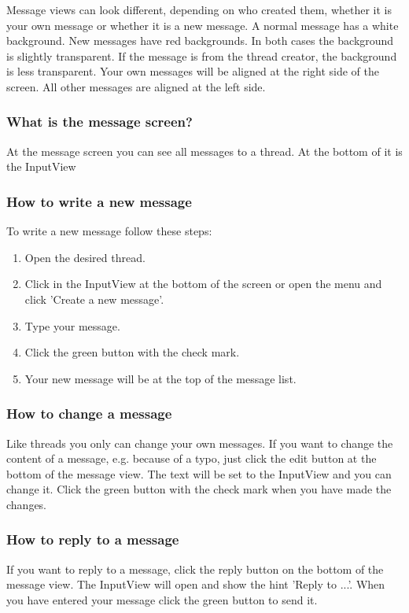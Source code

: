 \documentclass[12pt,a4paper,oneside]{report}
\begin{document}
Message views can look different, depending on who created them, whether it is your own message or whether it is a new message.
A normal message has a white background. New messages have red backgrounds. In both cases the background is slightly transparent. If the message is from the thread creator, the background is less transparent. 
Your own messages will be aligned at the right side of the screen. All other messages are aligned at the left side.

\subsubsection{What is the message screen?}
At the message screen you can see all messages to a thread. At the bottom of it is the InputView

\subsubsection{How to write a new message}
To write a new message follow these steps:
\begin{enumerate}
\item Open the desired thread.
\item Click in the InputView at the bottom of the screen or open the menu and click 'Create a new message'.
\item Type your message.
\item Click the green button with the check mark. 
\item Your new message will be at the top of the message list.
\end{enumerate}

\subsubsection{How to change a message}
Like threads you only can change your own messages. If you want to change the content of a message, e.g. because of a typo, just click the edit button at the bottom of the message view. The text will be set to the InputView and you can change it. Click the green button with the check mark when you have made the changes. 

\subsubsection{How to reply to a message}
If you want to reply to a message, click the reply button on the bottom of the message view. The InputView will open and show the hint 'Reply to ...'. When you have entered your message click the green button to send it.
\end{document}
